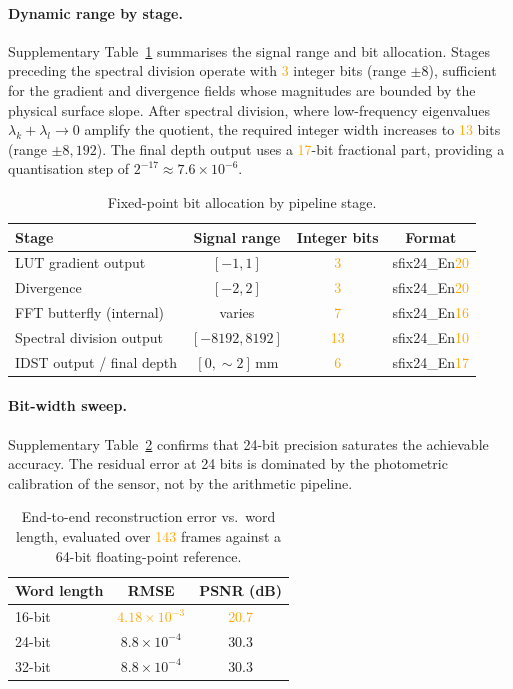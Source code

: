 \documentclass[10pt,a4paper]{article}
\newcommand{\placeholder}[1]{\textcolor{orange}{#1}}
\begin{document}
\paragraph{Dynamic range by stage.}
Supplementary Table~\ref{tab:s_bitalloc} summarises the signal range and bit allocation. Stages preceding the spectral division operate with \placeholder{3} integer bits (range $\pm 8$), sufficient for the gradient and divergence fields whose magnitudes are bounded by the physical surface slope. After spectral division, where low-frequency eigenvalues $\lambda_k + \lambda_l \to 0$ amplify the quotient, the required integer width increases to \placeholder{13} bits (range $\pm 8{,}192$). The final depth output uses a \placeholder{17}-bit fractional part, providing a quantisation step of $2^{-17} \approx 7.6 \times 10^{-6}$.

\begin{table}[h]
\centering
\caption{Fixed-point bit allocation by pipeline stage.}
\label{tab:s_bitalloc}
\begin{tabular}{@{}lccc@{}}
\toprule
Stage & Signal range & Integer bits & Format \\
\midrule
LUT gradient output & $[-1, 1]$ & \placeholder{3} & sfix24\_En\placeholder{20} \\
Divergence & $[-2, 2]$ & \placeholder{3} & sfix24\_En\placeholder{20} \\
FFT butterfly (internal) & varies & \placeholder{7} & sfix24\_En\placeholder{16} \\
Spectral division output & $[-8192, 8192]$ & \placeholder{13} & sfix24\_En\placeholder{10} \\
IDST output / final depth & $[0, \sim\!2]$\,mm & \placeholder{6} & sfix24\_En\placeholder{17} \\
\bottomrule
\end{tabular}
\end{table}

\paragraph{Bit-width sweep.}
Supplementary Table~\ref{tab:s_sweep} confirms that 24-bit precision saturates the achievable accuracy. The residual error at 24 bits is dominated by the photometric calibration of the sensor, not by the arithmetic pipeline.

\begin{table}[h]
\centering
\caption{End-to-end reconstruction error vs.\ word length, evaluated over \placeholder{143} frames against a 64-bit floating-point reference.}
\label{tab:s_sweep}
\begin{tabular}{@{}lcc@{}}
\toprule
Word length & RMSE & PSNR (dB) \\
\midrule
16-bit & \placeholder{$4.18 \times 10^{-3}$} & \placeholder{20.7} \\
24-bit & $8.8 \times 10^{-4}$ & 30.3 \\
32-bit & $8.8 \times 10^{-4}$ & 30.3 \\
\bottomrule
\end{tabular}
\end{table}
\end{document}
